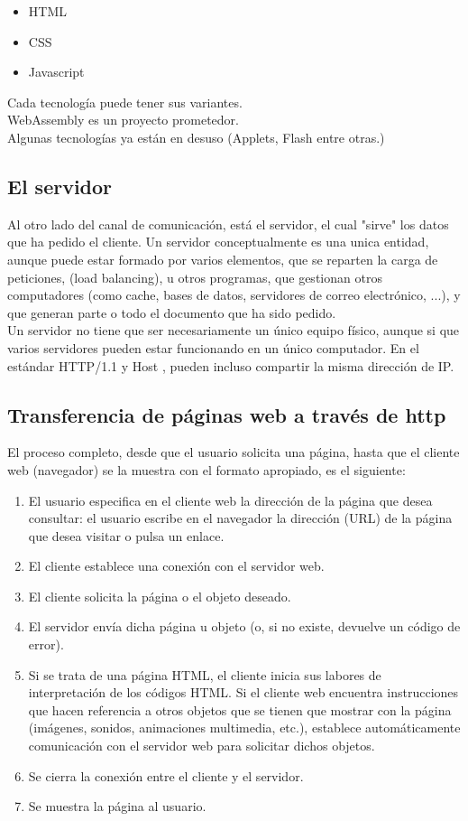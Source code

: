 \begin{itemize}
	\item HTML
	\item CSS
	\item Javascript
\end{itemize}
\begin{remark}
	Cada tecnología puede tener sus variantes.\\
	WebAssembly es un proyecto prometedor.\\
	Algunas tecnologías ya están en desuso (Applets, Flash entre otras.)
\end{remark}

\subsection{El servidor}
Al otro lado del canal de comunicación, está el servidor, el cual "sirve" los datos que ha pedido el cliente. Un servidor conceptualmente es una unica entidad, aunque puede estar formado por varios elementos, que se reparten la carga de peticiones, (load balancing), u otros programas, que gestionan otros computadores (como cache, bases de datos, servidores de correo electrónico, ...), y que generan parte o todo el documento que ha sido pedido. 
\\
Un servidor no tiene que ser necesariamente un único equipo físico, aunque si que varios servidores pueden estar funcionando en un único computador. En el estándar HTTP/1.1 y Host , pueden incluso compartir la misma dirección de IP.

\subsection{Transferencia de páginas web a través de http}

El proceso completo, desde que el usuario solicita una página, hasta que el cliente
web (navegador) se la muestra con el formato apropiado, es el siguiente:

\begin{enumerate}
	\item El usuario especifica en el cliente web la dirección de la página que desea consultar: el usuario escribe en el navegador la dirección (URL) de la página que
	desea visitar o pulsa un enlace.
	\item El cliente establece una conexión con el servidor web.
	\item El cliente solicita la página o el objeto deseado. 
	\item El servidor envía dicha página u objeto (o, si no existe, devuelve un código de
	error).
	\item Si se trata de una página HTML, el cliente inicia sus labores de interpretación
	de los códigos HTML. Si el cliente web encuentra instrucciones que hacen referencia a otros objetos que se tienen que mostrar con la página (imágenes, sonidos, animaciones multimedia, etc.), establece automáticamente comunicación
	con el servidor web para solicitar dichos objetos.
	\item Se cierra la conexión entre el cliente y el servidor.
	\item Se muestra la página al usuario.
\end{enumerate}

